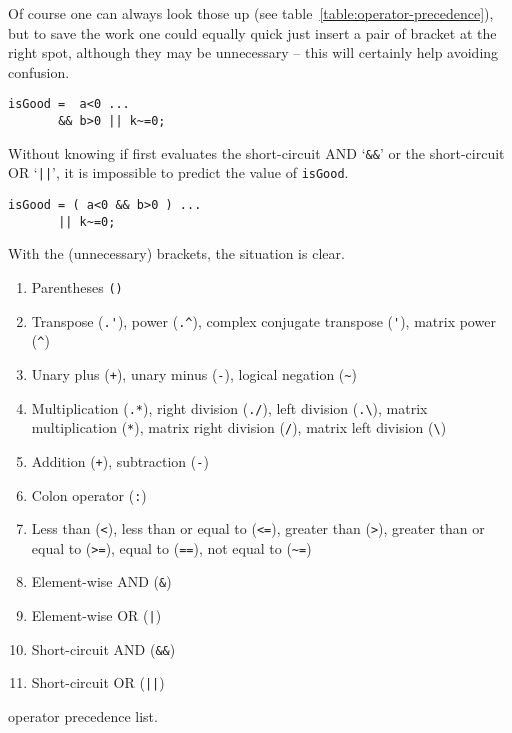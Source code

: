 Of course one can always look those up (see
table~\ref{table:operator-precedence}), but to save the work one could equally
quick just insert a pair of bracket at the right spot, although they may be
unnecessary -- this will certainly help avoiding confusion.

\hfill
\begin{minipage}[t]{.45\textwidth}
\begin{lstlisting}[framerule=2pt,rulecolor=\color{badred}]
isGood =  a<0 ...
       && b>0 || k~=0;
\end{lstlisting}
Without knowing if \matlab{} first evaluates the short-circuit AND `\lstinline!&&!' or the short-circuit OR `\lstinline!||!', it is impossible to predict the value of \lstinline!isGood!.
\end{minipage}
\hfill
\begin{minipage}[t]{.45\textwidth}
\begin{lstlisting}[framerule=2pt,rulecolor=\color{goodgreen}]
isGood = ( a<0 && b>0 ) ...
       || k~=0;
\end{lstlisting}
With the (unnecessary) brackets, the situation is clear.
\end{minipage}
\hfill


\begin{table}
\begin{enumerate}
\item Parentheses \lstinline!()!
\item Transpose (\lstinline!.'!), power (\lstinline!.^!), complex conjugate transpose (\lstinline!'!), matrix power (\lstinline!^!)
\item Unary plus (\lstinline!+!), unary minus (\lstinline!-!), logical negation (\lstinline!~!)
\item Multiplication (\lstinline!.*!), right division (\lstinline!./!), left division (\lstinline!.\!), matrix multiplication (\lstinline!*!), matrix right division (\lstinline!/!), matrix left division (\lstinline!\!)
\item Addition (\lstinline!+!), subtraction (\lstinline!-!)
\item Colon operator (\lstinline!:!)
\item Less than (\lstinline!<!), less than or equal to (\lstinline!<=!), greater than (\lstinline!>!), greater than or equal to (\lstinline!>=!), equal to (\lstinline!==!), not equal to (\lstinline!~=!)
\item Element-wise AND (\lstinline!&!)
\item Element-wise OR (\lstinline!|!)
\item Short-circuit AND (\lstinline!&&!)
\item Short-circuit OR (\lstinline!||!)
\end{enumerate}
\caption{\matlab{} operator precedence list.}
\label{table:operator-precedence}
\end{table}


